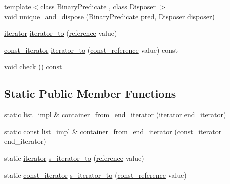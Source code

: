 \begin{DoxyCompactItemize}
\item 
{\footnotesize template$<$class Binary\+Predicate , class Disposer $>$ }\\void \hyperlink{classboost_1_1intrusive_1_1list__impl_ad3b3e0225cd52b5563fe2f2a2b49e3b2}{unique\+\_\+and\+\_\+dispose} (Binary\+Predicate pred, Disposer disposer)
\item 
\hyperlink{classboost_1_1intrusive_1_1list__impl_a15c0189bf62eb9fb98bc07ef10b8cb23}{iterator} \hyperlink{classboost_1_1intrusive_1_1list__impl_a51dd273b7b1163b87030157a59189a9e}{iterator\+\_\+to} (\hyperlink{classboost_1_1intrusive_1_1list__impl_a881763b587dbe7c0237a552a9e89755a}{reference} value)
\item 
\hyperlink{classboost_1_1intrusive_1_1list__impl_af4ced710fe02662c5650d161af83d8cd}{const\+\_\+iterator} \hyperlink{classboost_1_1intrusive_1_1list__impl_a67a906c22bb2ca0a9ddfc60224f5d8ba}{iterator\+\_\+to} (\hyperlink{classboost_1_1intrusive_1_1list__impl_a3d37629151c76fb8389ac3ba3b359201}{const\+\_\+reference} value) const
\item 
void \hyperlink{classboost_1_1intrusive_1_1list__impl_a7ae0ab138848f3a6fbe7da6f44617a75}{check} () const
\end{DoxyCompactItemize}
\subsection*{Static Public Member Functions}
\begin{DoxyCompactItemize}
\item 
static \hyperlink{classboost_1_1intrusive_1_1list__impl}{list\+\_\+impl} \& \hyperlink{classboost_1_1intrusive_1_1list__impl_a1432b9781e8f4525d61d0a529f37d03c}{container\+\_\+from\+\_\+end\+\_\+iterator} (\hyperlink{classboost_1_1intrusive_1_1list__impl_a15c0189bf62eb9fb98bc07ef10b8cb23}{iterator} end\+\_\+iterator)
\item 
static const \hyperlink{classboost_1_1intrusive_1_1list__impl}{list\+\_\+impl} \& \hyperlink{classboost_1_1intrusive_1_1list__impl_a1dabad9119bf0e3ab256f08944e14521}{container\+\_\+from\+\_\+end\+\_\+iterator} (\hyperlink{classboost_1_1intrusive_1_1list__impl_af4ced710fe02662c5650d161af83d8cd}{const\+\_\+iterator} end\+\_\+iterator)
\item 
static \hyperlink{classboost_1_1intrusive_1_1list__impl_a15c0189bf62eb9fb98bc07ef10b8cb23}{iterator} \hyperlink{classboost_1_1intrusive_1_1list__impl_aa6f586f577be78dc3acf107cd4b92d29}{s\+\_\+iterator\+\_\+to} (\hyperlink{classboost_1_1intrusive_1_1list__impl_a881763b587dbe7c0237a552a9e89755a}{reference} value)
\item 
static \hyperlink{classboost_1_1intrusive_1_1list__impl_af4ced710fe02662c5650d161af83d8cd}{const\+\_\+iterator} \hyperlink{classboost_1_1intrusive_1_1list__impl_a649d0e05d1597b0b8054006cb3d217c3}{s\+\_\+iterator\+\_\+to} (\hyperlink{classboost_1_1intrusive_1_1list__impl_a3d37629151c76fb8389ac3ba3b359201}{const\+\_\+reference} value)
\end{DoxyCompactItemize}
